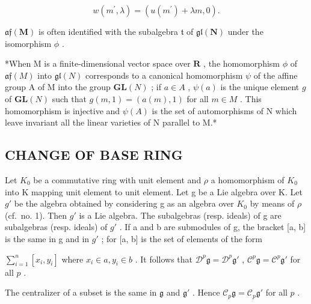 \[
w (m ^ {\prime}, \lambda) = (u (m ^ {\prime}) + \lambda m, 0).
\]

\(\mathfrak{af}(\mathbf{M})\) is often identified with the subalgebra \(\mathfrak{t}\) of \(\mathfrak{gl}(\mathbf{N})\) under the isomorphism \(\phi\) .

*When M is a finite-dimensional vector space over \(\mathbf{R}\) , the homomorphism \(\phi\) of \(\mathfrak{af}(M)\) into \(\mathfrak{gl}(N)\) corresponds to a canonical homomorphism \(\psi\) of the affine group A of M into the group \(\mathbf{GL}(N)\) ; if \(a \in A\) , \(\psi(a)\) is the unique element \(g\) of \(\mathbf{GL}(N)\) such that \(g(m, 1) = (a(m), 1)\) for all \(m \in M\) . This homomorphism is injective and \(\psi(A)\) is the set of automorphisms of N which leave invariant all the linear varieties of N parallel to M.*

\subsection{CHANGE OF BASE RING}

Let \(K_{0}\) be a commutative ring with unit element and \(\rho\) a homomorphism of \(K_{0}\) into K mapping unit element to unit element. Let g be a Lie algebra over K. Let \(g'\) be the algebra obtained by considering g as an algebra over \(K_{0}\) by means of \(\rho\) (cf.~no. 1). Then \(g'\) is a Lie algebra. The subalgebras (resp. ideals) of g are subalgebras (resp. ideals) of \(g'\) . If a and b are submodules of g, the bracket {[}a, b{]} is the same in g and in \(g'\) ; for {[}a, b{]} is the set of elements of the form

\(\sum_{i=1}^{n}\left[x_i,y_i\right]\) where \(x_{i}\in a,y_{i}\in b\) . It follows that \(\mathcal{D}^p\mathfrak{g} = \mathcal{D}^p\mathfrak{g}'\) , \(\mathcal{C}^p\mathfrak{g} = \mathcal{C}^p\mathfrak{g}'\) for all \(p\) .

The centralizer of a subset is the same in \(\mathfrak{g}\) and \(\mathfrak{g}'\) . Hence \(\mathcal{C}_p\mathfrak{g} = \mathcal{C}_p\mathfrak{g}'\) for all \(p\) .

